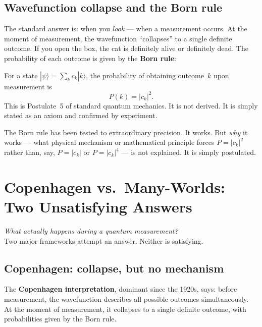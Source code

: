 \documentclass[11pt,a4paper]{article}
\newcommand{\term}[1]{\textbf{#1}}
\begin{document}
\subsection{Wavefunction collapse and the Born rule}

The standard answer is: when you \emph{look} --- when a measurement occurs.  At the
moment of measurement, the wavefunction ``collapses'' to a single definite outcome.
If you open the box, the cat is definitely alive or definitely dead.  The probability
of each outcome is given by the \term{Born rule}:

\begin{tcolorbox}[colback=boxorange,colframe=orange!60!black,title=The Born Rule (as postulated)]
  For a state $|\psi\rangle = \sum_k c_k |k\rangle$, the probability of
  obtaining outcome~$k$ upon measurement is
  \[
    P(k) = |c_k|^2.
  \]
  This is Postulate~5 of standard quantum mechanics.  It is not derived.
  It is simply stated as an axiom and confirmed by experiment.
\end{tcolorbox}

\noindent
The Born rule has been tested to extraordinary precision.  It works.  But
\emph{why} it works --- what physical mechanism or mathematical principle forces
$P = |c_k|^2$ rather than, say, $P = |c_k|$ or $P = |c_k|^4$ --- is not explained.
It is simply postulated.

\section{Copenhagen vs.\ Many-Worlds: Two Unsatisfying Answers}

\begin{tcolorbox}[colback=boxblue,colframe=blue!40!black,title=Key question]
\emph{What actually happens during a quantum measurement?}\\
Two major frameworks attempt an answer.  Neither is satisfying.
\end{tcolorbox}

\subsection{Copenhagen: collapse, but no mechanism}

The \term{Copenhagen interpretation}, dominant since the 1920s, says:
before measurement, the wavefunction describes all possible outcomes
simultaneously.  At the moment of measurement, it collapses to a single
definite outcome, with probabilities given by the Born rule.
\end{document}

